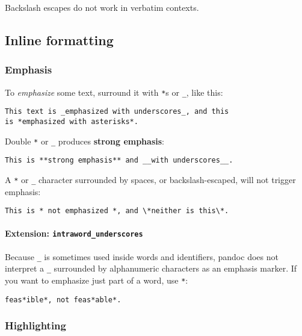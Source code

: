 \documentclass[
]{article}
\begin{document}
Backslash escapes do not work in verbatim contexts.

\subsection{Inline formatting}\label{inline-formatting}

\subsubsection{Emphasis}\label{emphasis}

To \emph{emphasize} some text, surround it with \texttt{*}s or
\texttt{\_}, like this:

\begin{verbatim}
This text is _emphasized with underscores_, and this
is *emphasized with asterisks*.
\end{verbatim}

Double \texttt{*} or \texttt{\_} produces \textbf{strong emphasis}:

\begin{verbatim}
This is **strong emphasis** and __with underscores__.
\end{verbatim}

A \texttt{*} or \texttt{\_} character surrounded by spaces, or
backslash-escaped, will not trigger emphasis:

\begin{verbatim}
This is * not emphasized *, and \*neither is this\*.
\end{verbatim}

\paragraph{\texorpdfstring{Extension:
\texttt{intraword\_underscores}}{Extension: intraword\_underscores}}\label{extension-intraword_underscores}

Because \texttt{\_} is sometimes used inside words and identifiers,
pandoc does not interpret a \texttt{\_} surrounded by alphanumeric
characters as an emphasis marker. If you want to emphasize just part of
a word, use \texttt{*}:

\begin{verbatim}
feas*ible*, not feas*able*.
\end{verbatim}

\subsubsection{Highlighting}\label{highlighting}
\end{document}
